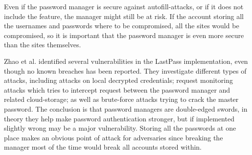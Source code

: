 \par Even if the password manager is secure against autofill-attacks, or if it does not include the feature, the manager might still be at risk. If the account storing all the usernames and passwords where to be compromised, all the sites would be compromised, so it is important that the password manager is even more secure than the sites themselves. 
\par Zhao et al. \cite{lastpass-security} identified several vulnerabilities in the LastPass implementation, even though no known breaches has been reported. They investigate different types of attacks, including attacks on local decrypted credentials; request monitoring attacks which tries to intercept request between the password manager and related cloud-storage; as well as brute-force attacks trying to crack the master password. The conclusion is that password managers are double-edged swords, in theory they help make password authentication stronger, but if implemented slightly wrong may be a major vulnerability. Storing all the passwords at one place makes an obvious point of attack for adversaries since breaking the manager most of the time would break all accounts stored within.





